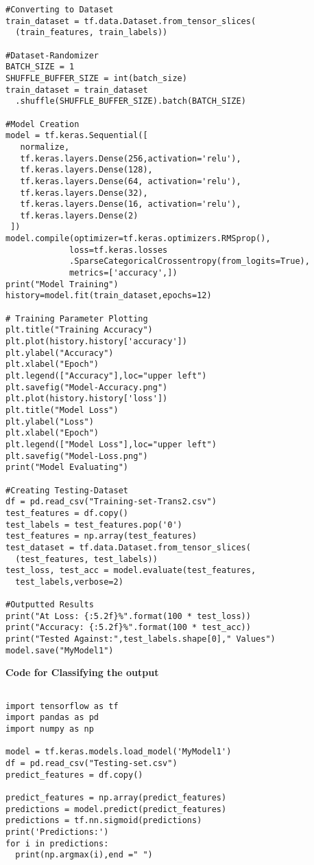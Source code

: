 \begin{appendices}
\begin{verbatim}
#Converting to Dataset
train_dataset = tf.data.Dataset.from_tensor_slices(
  (train_features, train_labels)) 
 
#Dataset-Randomizer
BATCH_SIZE = 1
SHUFFLE_BUFFER_SIZE = int(batch_size)
train_dataset = train_dataset
  .shuffle(SHUFFLE_BUFFER_SIZE).batch(BATCH_SIZE)
 
#Model Creation
model = tf.keras.Sequential([
   normalize,
   tf.keras.layers.Dense(256,activation='relu'),
   tf.keras.layers.Dense(128),
   tf.keras.layers.Dense(64, activation='relu'),
   tf.keras.layers.Dense(32),
   tf.keras.layers.Dense(16, activation='relu'),
   tf.keras.layers.Dense(2)
 ])
model.compile(optimizer=tf.keras.optimizers.RMSprop(),
             loss=tf.keras.losses
             .SparseCategoricalCrossentropy(from_logits=True),
             metrics=['accuracy',])
print("Model Training")
history=model.fit(train_dataset,epochs=12)
 
# Training Parameter Plotting
plt.title("Training Accuracy")
plt.plot(history.history['accuracy'])
plt.ylabel("Accuracy")
plt.xlabel("Epoch")
plt.legend(["Accuracy"],loc="upper left")
plt.savefig("Model-Accuracy.png")
plt.plot(history.history['loss'])
plt.title("Model Loss")
plt.ylabel("Loss")
plt.xlabel("Epoch")
plt.legend(["Model Loss"],loc="upper left")
plt.savefig("Model-Loss.png")
print("Model Evaluating")
 
#Creating Testing-Dataset
df = pd.read_csv("Training-set-Trans2.csv")
test_features = df.copy()
test_labels = test_features.pop('0')
test_features = np.array(test_features)
test_dataset = tf.data.Dataset.from_tensor_slices(
  (test_features, test_labels))
test_loss, test_acc = model.evaluate(test_features,
  test_labels,verbose=2)
 
#Outputted Results
print("At Loss: {:5.2f}%".format(100 * test_loss))
print("Accuracy: {:5.2f}%".format(100 * test_acc))
print("Tested Against:",test_labels.shape[0]," Values")
model.save("MyModel1")
 \end{verbatim}
\newpage
 \textbf{Code for Classifying the output}
 \begin{verbatim}

import tensorflow as tf
import pandas as pd
import numpy as np

model = tf.keras.models.load_model('MyModel1')
df = pd.read_csv("Testing-set.csv")
predict_features = df.copy()

predict_features = np.array(predict_features)
predictions = model.predict(predict_features)
predictions = tf.nn.sigmoid(predictions)
print('Predictions:')
for i in predictions:
  print(np.argmax(i),end =" ")
 \end{verbatim}

\end{appendices}
